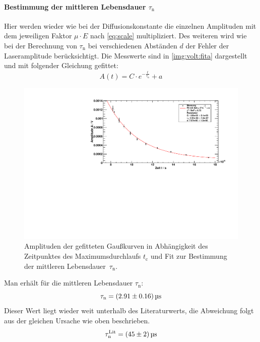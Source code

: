 \paragraph{Bestimmung der mittleren Lebensdauer $\tau_\text{n}$}
Hier werden wieder wie bei der Diffusionskonstante die einzelnen Amplituden mit dem jeweiligen Faktor $\mu \cdot E$ nach \autoref{eq:scale} 
multipliziert. Des weiteren wird wie bei der Berechnung von $\tau_\text{n}$ bei verschiedenen Abständen $d$ der Fehler der Laseramplitude 
berücksichtigt. Die Messwerte sind in \autoref{img:volt:fita} dargestellt und mit folgender Gleichung gefittet:
\begin{equation}
  A(t) = C \cdot e^{- \frac{t}{\tau_\text{n}}} + a
\end{equation}
\begin{figure}[H]
\begin{center}
  \includegraphics[width=\textwidth]{../img/part2/volt_fitA.pdf}
  \caption{Amplituden der gefitteten Gaußkurven in Abhängigkeit des Zeitpunktes des Maximumsdurchlaufs $t_{\text{c}}$
  und Fit zur Bestimmung der mittleren Lebensdauer~$\tau_{\text{n}}$.}
  \label{img:volt:fita}
\end{center}
\end{figure}
Man erhält für die mittleren Lebensdauer $\tau_\text{n}$:
\begin{equation}
  \tau_\text{n} = (2.91 \pm 0.16)\,\text{\textmu s}
\end{equation}
Dieser Wert liegt wieder weit unterhalb des Literaturwerts, die Abweichung folgt aus der gleichen Ursache wie oben beschrieben.
\begin{equation}
  \tau_\text{n}^\text{Lit} = (45 \pm 2)\,\text{\textmu s}
\end{equation}